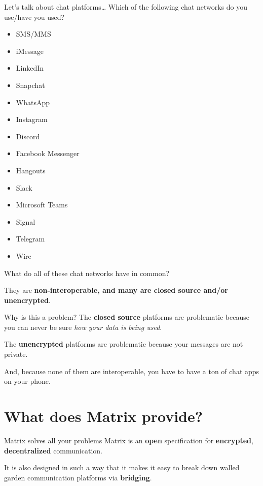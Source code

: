 \documentclass{acm}
\begin{document}
\begin{frame}{Let's talk about chat platforms\ldots}
    Which of the following chat networks do you use/have you used?
    \begin{multicols}{2}
        \begin{itemize}[<+->]
            \item SMS/MMS
            \item iMessage
            \item LinkedIn
            \item Snapchat
            \item WhatsApp
            \item Instagram
            \item Discord
            \item Facebook Messenger
            \item Hangouts
            \item Slack
            \item Microsoft Teams
            \item Signal
            \item Telegram
            \item Wire
        \end{itemize}
    \end{multicols}
    \pause[\thebeamerpauses]
    What do all of these chat networks have in common?
    \pause

    They are \textbf{non-interoperable, and many are closed source and/or
    unencrypted}.
\end{frame}

\begin{frame}{Why is this a problem?}
    The \textbf{closed source} platforms are problematic because you can never
    be sure \textit{how your data is being used}.
    \pause

    The \textbf{unencrypted} platforms are problematic because your messages are
    not private.
    \pause

    And, because none of them are interoperable, you have to have a ton of chat
    apps on your phone.
\end{frame}

\section{What does Matrix provide?}

\begin{frame}{Matrix solves all your problems}
    Matrix is an \textbf{open} specification for \textbf{encrypted},
    \textbf{decentralized} communication. \pause

    It is also designed in such a way that it makes it easy to break down walled
    garden communication platforms via \textbf{bridging}.

\end{frame}
\end{document}
